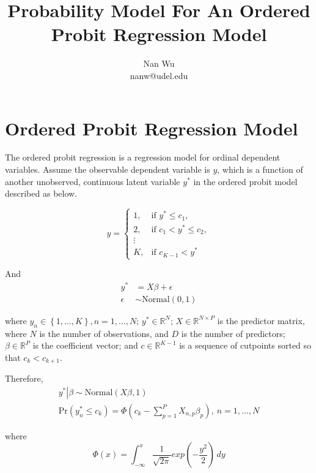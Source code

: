 \documentclass[12pt]{article}
\def\eqa{\left(c_k - \sum \limits_{p=1}^P X_{n,p}\beta_p \right)}
\begin{document}
\title{Probability Model For An Ordered Probit Regression Model}
\author{Nan Wu \\ nanw@udel.edu}
\date{}
\maketitle

\section{Ordered Probit Regression Model}

The ordered probit regression is a regression model for ordinal dependent variables. Assume the observable dependent variable is $y$, which is a function of another unobserved, continuous latent variable $y^*$ in the ordered probit model described as below.

\begin{equation*}
  y= \begin{cases}
    1, & \text{if $y^* \leq c_1$},\\
    2, & \text{if $c_1 < y^* \leq c_2$},\\
    \vdots \\
    K, & \text{if $c_{K-1} < y^*$}
  \end{cases}
\end{equation*}

And
\begin{align*}
  y^* &= X\beta + \epsilon \\
  \epsilon &\sim \mathrm{Normal}\left(0,1\right)
\end{align*}

where $y_n \in \left \{1,\ldots, K\right \}, n=1,\ldots,N$; $y^* \in \mathbb{R}^N$; $X\in \mathbb{R}^{N \times P}$ is the predictor matrix, where $N$ is the number of observations, and $D$ is the number of predictors; $\beta \in \mathbb{R}^P$ is the coefficient vector; and $c \in \mathbb{R}^{K-1}$  is a sequence of cutpoints sorted so that $c_k<c_{k+1}$.

Therefore,
\begin{gather*}
  \left. y^* \right|\beta \sim \mathrm{Normal}\left(X\beta, 1\right)\\
  \mathrm{Pr}\left(y^*_n \leq c_k\right)=\Phi \eqa, \ n=1,\ldots,N
\end{gather*}

where
\begin{equation}
  \Phi\left(x\right)=\int_{-\infty}^x \frac{1}{\sqrt{2\pi}}exp\left(-\frac{y^2}{2}\right)\,dy
\end{equation}
\end{document}
